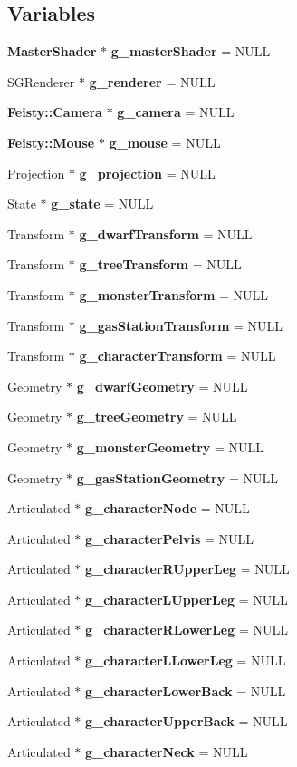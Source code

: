 \subsection*{Variables}
\begin{DoxyCompactItemize}
\item 
{\bf MasterShader} $\ast$ {\bf g\_\-masterShader} = NULL
\item 
SGRenderer $\ast$ {\bf g\_\-renderer} = NULL
\item 
{\bf Feisty::Camera} $\ast$ {\bf g\_\-camera} = NULL
\item 
{\bf Feisty::Mouse} $\ast$ {\bf g\_\-mouse} = NULL
\item 
Projection $\ast$ {\bf g\_\-projection} = NULL
\item 
State $\ast$ {\bf g\_\-state} = NULL
\item 
Transform $\ast$ {\bf g\_\-dwarfTransform} = NULL
\item 
Transform $\ast$ {\bf g\_\-treeTransform} = NULL
\item 
Transform $\ast$ {\bf g\_\-monsterTransform} = NULL
\item 
Transform $\ast$ {\bf g\_\-gasStationTransform} = NULL
\item 
Transform $\ast$ {\bf g\_\-characterTransform} = NULL
\item 
Geometry $\ast$ {\bf g\_\-dwarfGeometry} = NULL
\item 
Geometry $\ast$ {\bf g\_\-treeGeometry} = NULL
\item 
Geometry $\ast$ {\bf g\_\-monsterGeometry} = NULL
\item 
Geometry $\ast$ {\bf g\_\-gasStationGeometry} = NULL
\item 
Articulated $\ast$ {\bf g\_\-characterNode} = NULL
\item 
Articulated $\ast$ {\bf g\_\-characterPelvis} = NULL
\item 
Articulated $\ast$ {\bf g\_\-characterRUpperLeg} = NULL
\item 
Articulated $\ast$ {\bf g\_\-characterLUpperLeg} = NULL
\item 
Articulated $\ast$ {\bf g\_\-characterRLowerLeg} = NULL
\item 
Articulated $\ast$ {\bf g\_\-characterLLowerLeg} = NULL
\item 
Articulated $\ast$ {\bf g\_\-characterLowerBack} = NULL
\item 
Articulated $\ast$ {\bf g\_\-characterUpperBack} = NULL
\item 
Articulated $\ast$ {\bf g\_\-characterNeck} = NULL

\end{DoxyCompactItemize}
